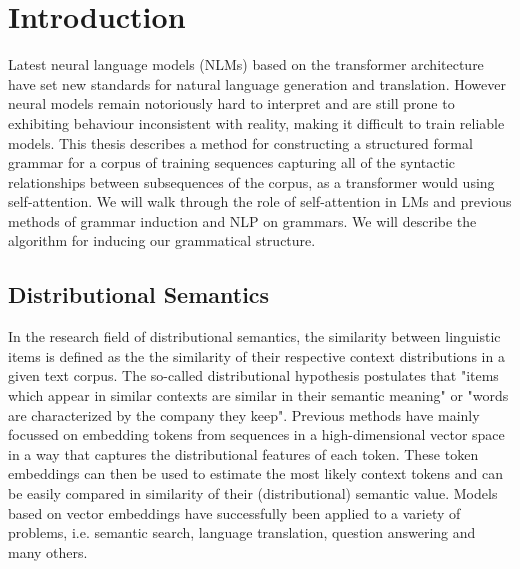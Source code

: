 
\chapter{Introduction}

Latest neural language models (NLMs) based on the transformer architecture have set new 
standards for natural language generation and translation. However neural models  
remain notoriously hard to interpret and are still prone to exhibiting behaviour 
inconsistent with reality, making it difficult to train reliable models.
This thesis describes a method for constructing a structured formal grammar for a corpus 
of training sequences capturing all of the syntactic relationships between subsequences 
of the corpus, as a transformer would using self-attention.
We will walk through the role of self-attention in LMs and previous methods
of grammar induction and NLP on grammars. We will describe the 
algorithm for inducing our grammatical structure.


\section{Distributional Semantics}

In the research field of distributional semantics, the similarity between linguistic 
items is defined as the the similarity of their respective context distributions in a 
given text corpus. The so-called distributional hypothesis postulates that "items which 
appear in similar contexts are similar in their semantic meaning" or "words are 
characterized by the company they keep".
Previous methods have mainly focussed on embedding tokens from sequences in a 
high-dimensional vector space in a way that captures the distributional features of each 
token. These token embeddings can then be used to estimate the most likely context tokens 
and can be easily compared in similarity of their (distributional) semantic value.
Models based on vector embeddings have successfully been applied to a variety of 
problems, i.e. semantic search, language translation, question answering and many others.

